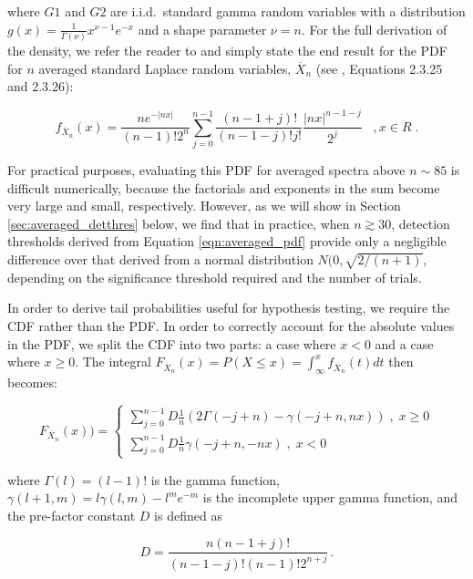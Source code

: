 \documentclass[12pt]{emulateapj}
\begin{document}
\noindent where $G1$ and $G2$ are i.i.d.\ standard gamma random variables with a distribution $g(x) = \frac{1}{\Gamma(\nu)} x^{\nu-1} e^{-x}$ and a shape parameter $\nu = n$. For the full derivation of the density, we refer the reader to \citet{kotz2001} and simply state the end result for the PDF for $n$ averaged standard Laplace random variables, $\overline{X}_n$ (see \citealt{kotz2001}, Equations 2.3.25 and 2.3.26):

\begin{equation}
f_{\overline{X}_n}(x) = \frac{n e^{-|nx|}}{(n-1)! 2^n} \sum_{j=0}^{n-1} \frac{(n-1+j)!}{(n-1-j)! j!} \frac{|nx|^{n-1-j}}{2^j} \; \;\;, x \in R \; .
\label{eqn:averaged_pdf}
\end{equation}

For practical purposes, evaluating this PDF for averaged spectra above $n\sim 85$ is difficult numerically, because the factorials and exponents in the sum become very large and small, respectively. However, as we will show in Section \ref{sec:averaged_detthres} below, we find that in practice, when $n \gtrsim 30$, detection thresholds derived from Equation \ref{eqn:averaged_pdf} provide only a negligible difference over that derived from a normal distribution $N(0, \sqrt{2/(n+1)}$, depending on the significance threshold required and the number of trials. 

In order to derive tail probabilities useful for hypothesis testing, we require the CDF rather than the PDF. In order to correctly account for the absolute values in the PDF, we split the CDF into two parts: a case where $x < 0$ and a case where $x \geq 0$. The integral $F_{\overline{X}_n}(x) = P ( X \leq x) = \int_{\infty}^{x} f_{\overline{X}_n}(t) dt$ then becomes:

\begin{equation}
\label{eqn:averaged_cdf}
F_{\overline{X}_n}(x)) = 
  \begin{cases} 
   \sum_{j=0}^{n-1} D \frac{1}{n}(2\Gamma(-j+n) - \gamma(-j+n, nx)) \;, \;x \geq 0 \\
     \sum_{j=0}^{n-1} D  \frac{1}{n}\gamma(-j+n, -nx) \;,\; x < 0
  \end{cases}
\end{equation}

\noindent where $\Gamma(l)= (l-1)!$ is the gamma function, $\gamma(l+1, m) = l\gamma(l,m) - l^m e^{-m}$ is the incomplete upper gamma function, and the pre-factor constant $D$ is defined as 

\[
D = \frac{n(n-1+j)!}{(n-1-j)! (n-1)! 2^{n+j}} \, .
\]
\end{document}
